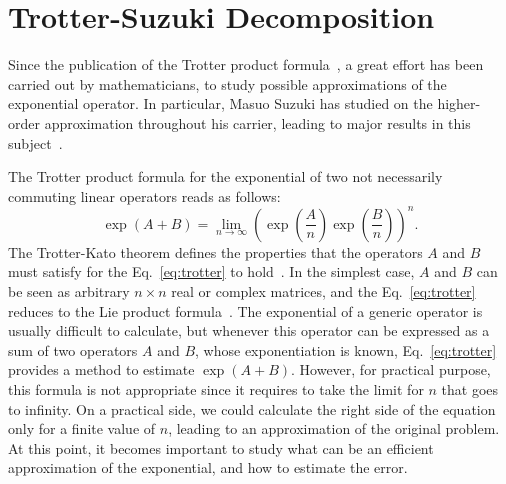 \chapter{Trotter-Suzuki Decomposition}
Since the publication of the Trotter product formula~\cite{trotter1959product}, a great effort has been carried out by mathematicians, to study possible approximations of the exponential operator. In particular, Masuo Suzuki has studied on the higher-order approximation throughout his carrier, leading to major results in this subject~\cite{suzuki1985decomposition,suzuki1990fractal,Suzuki1992387, suzuki1994quantum,Suzuki1995425,suzuki1997algebraic,Suzuki200032}.

The Trotter product formula for the exponential of two not necessarily commuting linear operators reads as follows:
\begin{equation} \label{eq:trotter}
\exp{(A+B)} = \lim_{n\rightarrow\infty} \left(\exp\left({\frac{A}{n}}\right) \exp{\left(\frac{B}{n}\right)}\right)^n.
\end{equation}
The Trotter-Kato theorem defines the properties that the operators $A$ and $B$ must satisfy for the Eq.~\eqref{eq:trotter} to hold~\cite{KatoTosio1978}. In the simplest case, $A$ and $B$ can be seen as arbitrary $n\times n$ real or complex matrices, and the Eq.~\eqref{eq:trotter} reduces to the Lie product formula~\cite{SophusLie1888}. The exponential of a generic operator is usually difficult to calculate, but whenever this operator can be expressed as a sum of two operators $A$ and $B$, whose exponentiation is known, Eq.~\eqref{eq:trotter} provides a method to estimate $\exp{(A+B)}$. However, for practical purpose, this formula is not appropriate since it requires to take the limit for $n$ that goes to infinity. On a practical side, we could calculate the right side of the equation only for a finite value of $n$, leading to an approximation of the original problem. At this point, it becomes important to study what can be an efficient approximation of the exponential, and how to estimate the error.

